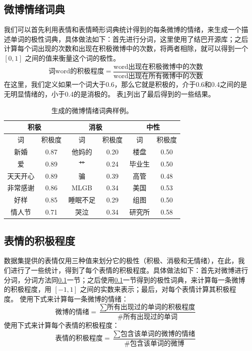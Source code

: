 \documentclass[12pt, oneside]{article}
\begin{document}
\begin{spacing}{1.5}
\begin{CJK}{UTF8}{gbsn}
\subsection{微博情绪词典}
\label{subsec:polar_dict}
我们可以首先利用表情和表情畸形词典统计得到的每条微博的情绪，来生成一个描述单词的极性词典，具体做法如下：首先进行分词，这里使用了结巴开源库；之后计算每个词出现的次数和出现在积极微博中的次数，将两者相除，就可以得到一个 $[0, 1]$ 之间的值来衡量这个词的极性。
$$\text{词word的积极程度}= \frac{\text{word出现在积极微博中的次数}}{\text{word出现在所有微博中的次数}}$$
在这里，我们定义如果一个词大于0.6，那么它就是积极的，介于0.6和0.4之间的是无明显情绪的，小于0.4的是消极的。
表\ref{tbl:polar_dict}列出了最后得到的一些结果。

\begin{table}[]
\centering
\begin{tabular}{|c|c|c|c|c|c|}
\hline
\multicolumn{2}{|c|}{积极} & \multicolumn{2}{c|}{消极} & \multicolumn{2}{c|}{中性} \\ \hline
词           & 积极度        & 词          & 积极度        & 词          & 积极度        \\ \hline
新婚          & 0.87       & 他妈的        & 0.20       & 楼盘         & 0.50       \\ \hline
爱           & 0.89       & 艹          & 0.24       & 毕业生        & 0.50       \\ \hline
天天开心        & 0.89       & 骗          & 0.39       & 高管         & 0.48       \\ \hline
非常感谢        & 0.86       & MLGB       & 0.34       & 美国         & 0.53       \\ \hline
好样          & 0.85       & 睡眠不足       & 0.29       & 组图         & 0.50       \\ \hline
情人节         & 0.71       & 哭泣         & 0.34       & 研究所        & 0.58       \\ \hline
\end{tabular}
\caption{生成的微博情绪词典样例。}
\label{tbl:polar_dict}
\end{table}

\subsection{表情的积极程度}
数据集提供的表情仅用三种值来划分它的极性（积极、消极和无情绪），在此，我们进行了一些统计，得到了每个表情的积极程度。具体做法如下：首先对微博进行分词，分词方法同\ref{subsec:polar_dict}一节；之后使用\ref{subsec:polar_dict}一节得到的极性词典，来计算每一条微博的积极程度，用 $[-1, 1]$ 之间的实数来表示；最后，对每个表情计算其积极程度。
使用下式来计算每一条微博的情绪：
$$\text{微博的情绪} = \frac{\sum{\text{所有出现过的单词的积极程度}}}{\text{\#所有出现过的单词}}$$
使用下式来计算每个表情的积极程度：
$$\text{表情的积极程度} = \frac{\sum{\text{包含该单词的微博的情绪}}}{\text{\#包含该单词的微博}}$$


\end{CJK}
\end{spacing}
\end{document}
